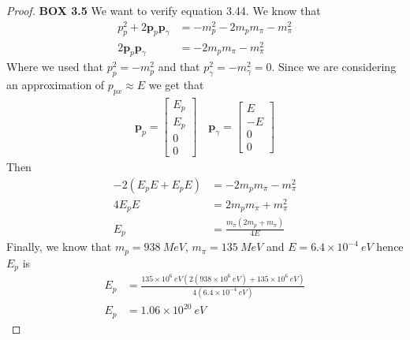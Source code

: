\documentclass[11pt]{article}
\theoremstyle{definition}
\begin{document}
\cleardoublepage
\begin{proof}{\textbf{BOX 3.5}}
    We want to verify equation 3.44. We know that
    \begin{align*}
        p_p^2 + 2\bm{p}_p\bm{p}_\gamma &= -m_p^2 -2m_pm_\pi - m_\pi^2\\
        2\bm{p}_p\bm{p}_\gamma &= -2m_pm_\pi - m_\pi^2
    \end{align*}
    Where we used that $p_p^2 = -m_p^2$ and that $p_\gamma^2 = -m_\gamma^2 = 0$.
    Since we are considering an approximation of $p_{px} \approx E$ we get that
    \begin{align*}
        \bm{p}_p = \begin{bmatrix}E_p \\ E_p\\ 0 \\ 0\end{bmatrix}\quad
        \bm{p}_\gamma = \begin{bmatrix}E \\ -E \\ 0 \\ 0\end{bmatrix}
    \end{align*}
    Then
    \begin{align*}
        -2(E_pE + E_p E) &= -2m_pm_\pi - m_\pi^2\\
        4E_pE &= 2m_pm_\pi + m_\pi^2\\
        E_p &= \frac{m_\pi(2m_p + m_\pi)}{4E}
    \end{align*}
    Finally, we know that $m_p = 938~MeV$, $m_\pi= 135~MeV$ and
    $E = 6.4\times10^{-4}~eV$ hence $E_p$ is
    \begin{align*}
        E_p &= \frac{135\times10^{6}~eV(2(938\times10^{6}~eV) + 135\times10^{6}~eV)}{4(6.4\times10^{-4}~eV)}\\
        E_p &= 1.06 \times 10^{20}~eV
    \end{align*}
\end{proof}
\cleardoublepage
\end{document}
